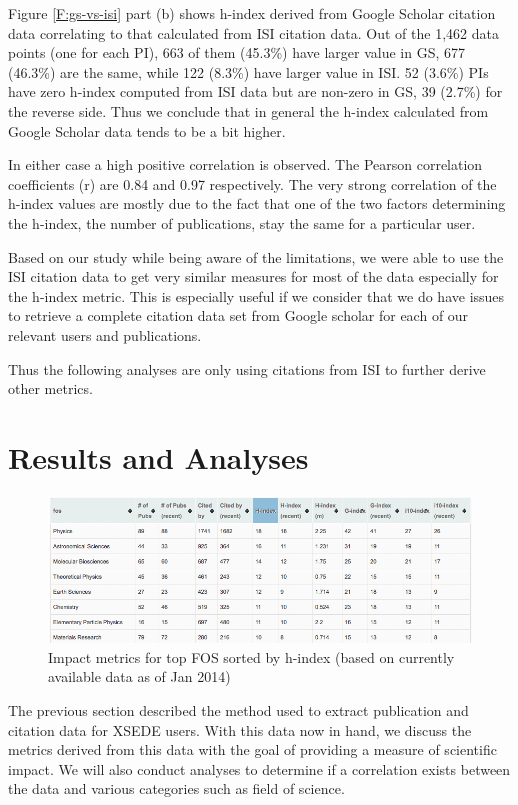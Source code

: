 \documentclass{tex/sig-alternate}
\begin{document}
Figure \ref{F:gs-vs-isi} part (b) shows h-index derived from Google Scholar citation data correlating to that calculated from ISI citation data. Out of the 1,462 data points (one for each PI), 663 of them (45.3\%) have larger value in GS, 677 (46.3\%) are the same, while 122 (8.3\%) have larger value in ISI. 52 (3.6\%) PIs have zero h-index computed from ISI data but are non-zero in GS, 39 (2.7\%) for the reverse side. Thus we conclude that in general the h-index calculated from Google Scholar data tends to be a bit higher. 
 
In either case a high positive correlation is observed. The Pearson correlation coefficients (r) are 0.84 and 0.97 respectively. The very strong correlation of the h-index values are mostly due to the fact that one of the two factors determining the h-index, the number of publications, stay the same for a particular user. 
 
Based on our study while being aware of the limitations, we were able to use the ISI citation data to get very similar measures for most of the data especially for the h-index metric. This is especially useful if we consider that we do have issues to retrieve a complete citation data set from Google scholar for each of our relevant users and publications.

Thus the following analyses are only using citations from ISI to further derive other metrics. 
 
\section{Results and Analyses} \label{S:result}

\begin{figure}[!htb] 
  \centering 
    \includegraphics[width=1.5\columnwidth]{images/XDPUBS_Metrics_FOS.png} 
  \caption{Impact metrics for top FOS sorted by h-index (based on currently available data as of Jan 2014)}\label{F:xdpubs-metrics-fos} 
\end{figure} 
 
The previous section described the method used to extract publication and citation data for XSEDE users.  With this data now in hand, we discuss the metrics derived from this data with the goal of providing a measure of scientific impact. We will also conduct analyses to determine if a correlation exists between the data and various categories such as field of science. 
 
\end{document}
